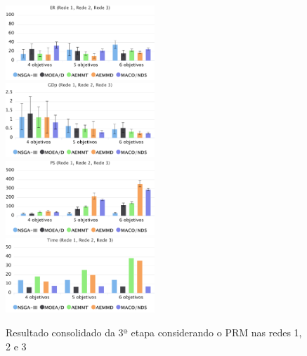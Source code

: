 \begin{figure}[!htbp]	
	\includegraphics[width=0.5\textwidth]{cap_experimentos/figs/etapa3/er-mrp-todos}
	\includegraphics[width=0.5\textwidth]{cap_experimentos/figs/etapa3/gd-mrp-todos}
	\includegraphics[width=0.5\textwidth]{cap_experimentos/figs/etapa3/ps-mrp-todos}
	\includegraphics[width=0.5\textwidth]{cap_experimentos/figs/etapa3/time-mrp-todos}
	\caption{\label{fig_exp3_prm_todos}Resultado consolidado da 3ª etapa considerando o PRM nas redes 1, 2 e 3}
\end{figure}

